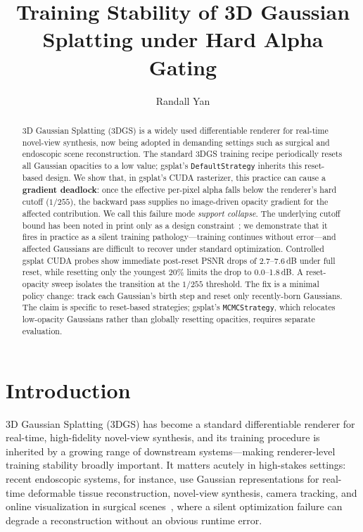 \documentclass[runningheads]{llncs}
\title{Training Stability of 3D Gaussian Splatting under Hard Alpha Gating}
\author{Randall Yan}
\institute{Independent Researcher\\
    \email{randall.yanh@gmail.com}}
\newcommand{\DefaultStrategy}{\texttt{Default\allowbreak Strategy}}
\begin{document}
\maketitle

\begin{abstract}
3D Gaussian Splatting (3DGS) is a widely used differentiable renderer for real-time novel-view synthesis, now being adopted in demanding settings such as surgical and endoscopic scene reconstruction. The standard 3DGS training recipe periodically resets all Gaussian opacities to a low value; gsplat's \DefaultStrategy{} inherits this reset-based design. We show that, in gsplat's CUDA rasterizer, this practice can cause a \textbf{gradient deadlock}: once the effective per-pixel alpha falls below the renderer's hard cutoff ($1/255$), the backward pass supplies no image-driven opacity gradient for the affected contribution. We call this failure mode \emph{support collapse}. The underlying cutoff bound has been noted in print only as a design constraint~\cite{fastergs2026}; we demonstrate that it fires in practice as a silent training pathology---training continues without error---and affected Gaussians are difficult to recover under standard optimization. Controlled gsplat CUDA probes show immediate post-reset PSNR drops of 2.7--7.6\,dB under full reset, while resetting only the youngest 20\% limits the drop to 0.0--1.8\,dB. A reset-opacity sweep isolates the transition at the $1/255$ threshold. The fix is a minimal policy change: track each Gaussian's birth step and reset only recently-born Gaussians. The claim is specific to reset-based strategies; gsplat's \texttt{MCMCStrategy}, which relocates low-opacity Gaussians rather than globally resetting opacities, requires separate evaluation.

\end{abstract}

\section{Introduction}

3D Gaussian Splatting (3DGS) has become a standard differentiable renderer for real-time, high-fidelity novel-view synthesis, and its training procedure is inherited by a growing range of downstream systems---making renderer-level training stability broadly important. It matters acutely in high-stakes settings: recent endoscopic systems, for instance, use Gaussian representations for real-time deformable tissue reconstruction, novel-view synthesis, camera tracking, and online visualization in surgical scenes~\cite{endogaussian2024,endogslam2024}, where a silent optimization failure can degrade a reconstruction without an obvious runtime error.
\end{document}
